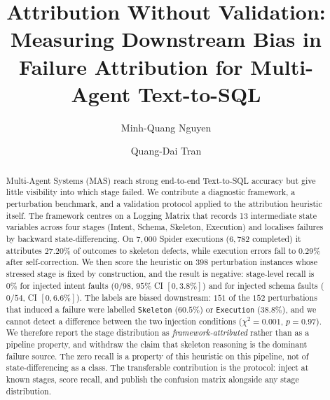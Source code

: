 \documentclass{llncs}
\begin{document}
\title{Attribution Without Validation:\\ Measuring Downstream Bias
in Failure Attribution for Multi-Agent Text-to-SQL}


\author{Minh-Quang Nguyen \and Quang-Dai Tran}


\maketitle

\begin{abstract}
Multi-Agent Systems (MAS) reach strong end-to-end Text-to-SQL accuracy but
give little visibility into which stage failed. We contribute a diagnostic
framework, a perturbation benchmark, and a validation protocol applied to the
attribution heuristic itself. The framework centres on a Logging Matrix that
records 13 intermediate state variables across four stages (Intent, Schema,
Skeleton, Execution) and localises failures by backward state-differencing.
On $7{,}000$ Spider executions ($6{,}782$ completed) it attributes $27.20\%$ of
outcomes to skeleton defects, while execution errors fall to $0.29\%$ after
self-correction. We then score the heuristic on $398$ perturbation instances
whose stressed stage is fixed by construction, and the result is negative:
stage-level recall is $0\%$ for injected intent faults ($0/98$, $95\%$ CI
$[0,3.8\%]$) and for injected schema faults ($0/54$, CI $[0,6.6\%]$). The
labels are biased downstream: $151$ of the $152$ perturbations that induced a
failure were labelled \texttt{Skeleton} ($60.5\%$) or \texttt{Execution}
($38.8\%$), and we cannot detect a difference between the two injection
conditions ($\chi^2=0.001$, $p=0.97$). We therefore report the stage distribution as
\emph{framework-attributed} rather than as a pipeline property, and withdraw
the claim that skeleton reasoning is the dominant failure source. The zero
recall is a property of this heuristic on this pipeline, not of
state-differencing as a class. The transferable contribution is the
protocol: inject at known stages, score recall, and publish the confusion
matrix alongside any stage distribution.

\end{abstract}
\end{document}
